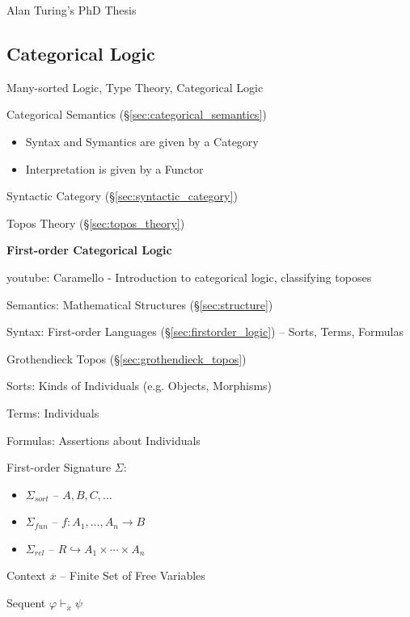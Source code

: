 Alan Turing's PhD Thesis \cite{turing38}



\subsection{Categorical Logic}\label{sec:categorical_logic}

Many-sorted Logic, Type Theory, Categorical Logic

Categorical Semantics (\S\ref{sec:categorical_semantics})

\begin{itemize}
  \item Syntax and Symantics are given by a Category
  \item Interpretation is given by a Functor
\end{itemize}

Syntactic Category (\S\ref{sec:syntactic_category})

Topos Theory (\S\ref{sec:topos_theory})


\textbf{First-order Categorical Logic}

youtube: Caramello - Introduction to categorical logic, classifying
toposes

Semantics: Mathematical Structures (\S\ref{sec:structure})

Syntax: First-order Languages (\S\ref{sec:firstorder_logic}) --
Sorts, Terms, Formulas

Grothendieck Topos (\S\ref{sec:grothendieck_topos})

Sorts: Kinds of Individuals (e.g. Objects, Morphisms) %

Terms: Individuals

Formulas: Assertions about Individuals


First-order Signature $\Sigma$:
\begin{itemize}
  \item $\Sigma_{sort}$ -- $A,B,C,\ldots$
  \item $\Sigma_{fun}$ -- $f : A_1, \ldots, A_n \rightarrow B$
  \item $\Sigma_{rel}$ -- $R \hookrightarrow A_1 \times \cdots \times
    A_n$
\end{itemize}

Context $\overline{x}$ -- Finite Set of Free Variables

Sequent $\varphi \vdash_{\overline{x}} \psi$

